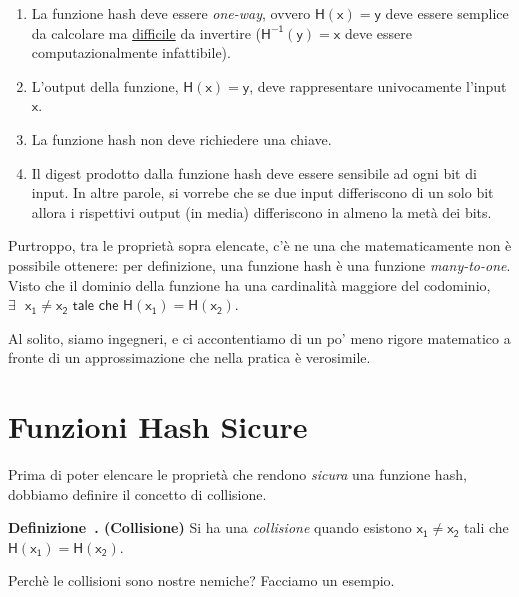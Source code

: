 \documentclass{article}
\newcounter{definition}[section]
\newenvironment{definition}[1][]{\refstepcounter{definition}\par\medskip
   \noindent \textbf{Definizione~\thedefinition. (#1)} \rmfamily}{\medskip}
\begin{document}
\begin{enumerate}
    \item La funzione hash deve essere \textit{one-way}, ovvero $\mathsf{H(x) = y}$ deve essere semplice da calcolare ma \underline{difficile} da 
    invertire ($\mathsf{H^{-1}(y) = x}$ deve essere computazionalmente infattibile).
    \item L'output della funzione, $\mathsf{H(x) = y}$, deve rappresentare univocamente l'input $\mathsf{x}$.
    \item La funzione hash non deve richiedere una chiave.
    \item Il digest prodotto dalla funzione hash deve essere sensibile ad ogni bit di input. In altre parole, si vorrebe che se due input 
    differiscono di un solo bit allora i rispettivi output (in media) differiscono in almeno la metà dei bits.
\end{enumerate}

\par \noindent Purtroppo, tra le proprietà sopra elencate, c'è ne una che matematicamente non è possibile ottenere: per definizione, 
una funzione hash è una funzione \textit{many-to-one}. Visto che il dominio della funzione ha una cardinalità maggiore del codominio, 
$\mathsf{\exists \text{ } x_{1} \neq x_2 \text{ tale che } H(x_1) = H(x_2)}$.

\par \noindent Al solito, siamo ingegneri, e ci accontentiamo di un po' meno rigore matematico a fronte di un approssimazione che nella pratica è 
verosimile.

\section{Funzioni Hash Sicure}
Prima di poter elencare le proprietà che rendono \textit{sicura} una funzione hash, dobbiamo definire il concetto di collisione.

\begin{definition}[Collisione]
    Si ha una \textit{collisione} quando esistono $\mathsf{x_1 \neq x_2}$ tali che $\mathsf{H(x_1) = H(x_2)}$.
\end{definition}

\noindent Perchè le collisioni sono nostre nemiche? Facciamo un esempio.
\end{document}
